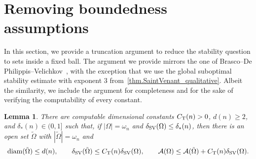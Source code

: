 \documentclass[11pt]{amsart}
\newcommand{\lemmname}{Lemma}
\theoremstyle{plain}
\newtheorem{lemma}[theorem]{\lemmname}
\theoremstyle{definition}
\newcommand\diam{\mathop{\rm diam}}
\begin{document}
\section{Removing boundedness assumptions}\label{sec.sharp_SV_unbounded}

In this section, we provide a truncation argument to reduce the stability question to sets inside a fixed ball. The argument we provide mirrors the one of Brasco--De Philippis--Velichkov~\cite[Lemma~5.3]{brasco2015faber}, with the exception that we use the global suboptimal stability estimate with exponent $3$ from~\ref{thm.SaintVenant_qualitative}. Albeit the similarity, we include the
argument for completeness and for the sake of verifying the computability of every constant.

\begin{lemma}\label{lemma.truncation}
There are computable dimensional constants $C_{\rm T}(n)>0$, $d(n)\ge2$,
and $\delta_*(n)\in(0,1]$ such that, if $|\Omega|=\omega_n$ and $\delta_{\rm SV}(\Omega)\le\delta_*(n)$, then there is an open set $\tilde\Omega$ with $|\tilde\Omega|=\omega_n$ and
\begin{equation}\label{eq.truncation}
 \diam(\tilde\Omega)\le d(n),\qquad
 \delta_{\rm SV}(\tilde\Omega)
 \le C_{\rm T}(n)\delta_{\rm SV}(\Omega),\qquad
 \mathcal A(\Omega)\le\mathcal A(\tilde\Omega)
 +C_{\rm T}(n)\delta_{\rm SV}(\Omega).
\end{equation}
\end{lemma}
\end{document}
